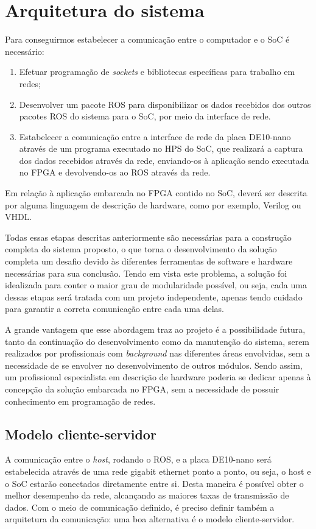 \chapter{Arquitetura do sistema}\label{cap:arquitetura}

Para conseguirmos estabelecer a comunicação entre o computador e o SoC é necessário:

\begin{enumerate}
	\item Efetuar programação de \textit{sockets} e bibliotecas específicas para trabalho em redes; 
	
	\item Desenvolver um pacote ROS para disponibilizar os dados recebidos dos outros pacotes ROS do sistema para o SoC, por meio da interface de rede. 
	
	\item Estabelecer a comunicação entre a interface de rede da placa DE10-nano através de um programa executado no HPS do SoC, que realizará a captura dos dados recebidos através da rede, enviando-os à aplicação sendo executada no FPGA e devolvendo-os ao ROS através da rede. 
\end{enumerate}

Em relação à aplicação embarcada no FPGA contido no SoC, deverá ser descrita por alguma linguagem de descrição de hardware, como por exemplo, Verilog ou VHDL\@.

Todas essas etapas descritas anteriormente são necessárias para a construção completa do sistema proposto, o que torna o desenvolvimento da solução completa um desafio devido às diferentes ferramentas de software e hardware necessárias para sua conclusão. Tendo em vista este problema, a solução foi idealizada para conter o maior grau de modularidade possível, ou seja, cada uma dessas etapas será tratada com um projeto independente, apenas tendo cuidado para garantir a correta comunicação entre cada uma delas.

A grande vantagem que esse abordagem traz ao projeto é a possibilidade futura, tanto da continuação do desenvolvimento como da manutenção do sistema, serem realizados por profissionais com \textit{background} nas diferentes áreas envolvidas, sem a necessidade de se envolver no desenvolvimento de outros módulos. Sendo assim, um profissional especialista em descrição de hardware poderia se dedicar apenas à concepção da solução embarcada no FPGA, sem a necessidade de possuir conhecimento em programação de redes. 

\section{Modelo cliente-servidor}
A comunicação entre o \textit{host}, rodando o ROS, e a placa DE10-nano será estabelecida através de uma rede gigabit ethernet ponto a ponto, ou seja, o host e o SoC estarão conectados diretamente entre si. Desta maneira é possível obter o melhor desempenho da rede, alcançando as maiores taxas de transmissão de dados. Com o meio de comunicação definido, é preciso definir também a arquitetura da comunicação: uma boa alternativa é o modelo cliente-servidor.

